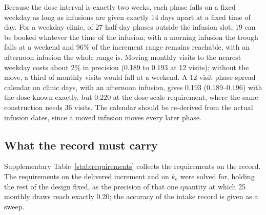 Because the dose interval is exactly two weeks, each phase falls on a fixed weekday as long as
infusions are given exactly 14 days apart at a fixed time of day. For a weekday clinic, of 27
half-day phases outside
the infusion slot, 19 can be booked whatever the time of the infusion; with a morning infusion
the trough falls at a weekend and 96\% of the increment range remains reachable, with an
afternoon infusion the whole range is. Moving monthly visits to the nearest weekday costs about
2\% in precision (0.189 to 0.193 at 12 visits); without the move, a third of monthly visits would
fall at a weekend. A 12-visit phase-spread calendar on clinic days, with an afternoon infusion,
gives 0.193 (0.189--0.196) with the dose known exactly, but 0.220 at the dose-scale requirement, where the same construction
needs 36 visits. The calendar should be re-derived from the actual infusion dates, since a moved
infusion moves every later phase.


\subsection{What the record must carry}
\label{si:s2:record}

Supplementary Table~\ref{stab:requirements} collects the requirements on the record. The
requirements on the delivered increment and on $k_e$ were solved for, holding the rest of the
design fixed, as the precision of that one quantity at which 25 monthly draws reach exactly 0.20;
the accuracy of the intake record is given as a sweep.

